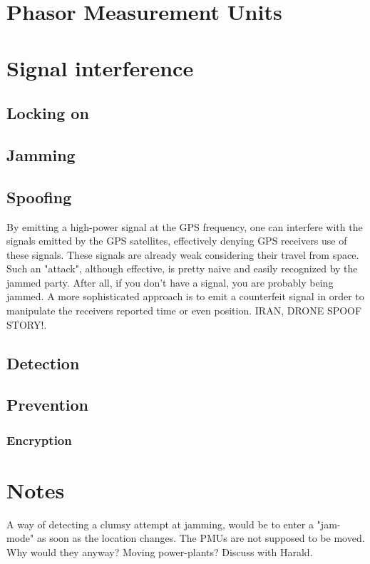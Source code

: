 \documentclass[12pt,english,a4paper]{article}
\begin{document}
\cite{GPSGOVTE} 


\section{Phasor Measurement Units}

\section{Signal interference}
\subsection{Locking on}
\subsection{Jamming}
\subsection{Spoofing}

By emitting a high-power signal at the GPS frequency, one can interfere with the signals emitted by the GPS satellites, effectively denying GPS receivers use of these signals. These signals are already weak considering their travel from space. Such an "attack", although effective, is pretty naive and easily recognized by the jammed party. After all, if you don't have a signal, you are probably being jammed. A more sophisticated approach is to emit a counterfeit signal in order to manipulate the receivers reported time or even position. IRAN, DRONE SPOOF STORY!. 


\subsection{Detection}
\subsection{Prevention}
\subsubsection{Encryption}

\section{Notes}
A way of detecting a clumsy attempt at jamming, would be to enter a "jam-mode" as soon as the location changes. The PMUs are not supposed to be moved. Why would they anyway? Moving power-plants? Discuss with Harald.

\newpage
\printbibliography[title={Complete Bibliography},heading=bibintoc]
\end{document}
